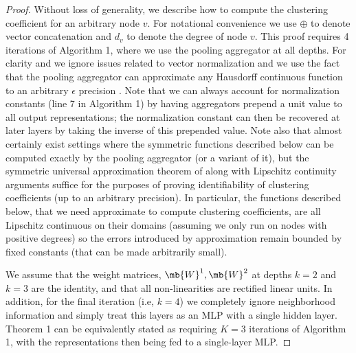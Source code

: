 \begin{proof}
Without loss of generality, we describe how to compute the clustering coefficient for an arbitrary node $v$.
For notational convenience we use $\oplus$ to denote vector concatenation and $d_v$ to denote the degree of node $v$.
This proof requires 4 iterations of Algorithm 1, where we use the pooling aggregator at all depths. 
For clarity and we ignore issues related to vector normalization and we use the fact that the pooling aggregator can approximate any Hausdorff continuous function to an arbitrary $\epsilon$ precision \cite{qi2016pointnet}.
Note that we can always account for normalization constants (line 7 in Algorithm 1) by having aggregators prepend a unit value to all output representations; the normalization constant can then be recovered at later layers by taking the inverse of this prepended value. 
Note also that almost certainly exist settings where the symmetric functions described below can be computed exactly by the pooling aggregator (or a variant of it), but the symmetric universal approximation theorem of \cite{qi2016pointnet} along with Lipschitz continuity arguments suffice for the purposes of proving identifiability of clustering coefficients (up to an arbitrary precision).
In particular, the functions described below, that we need approximate to compute clustering coefficients, are all Lipschitz continuous on their domains (assuming we only run on nodes with positive degrees) so the errors introduced by approximation remain bounded by fixed constants (that can be made arbitrarily small). 

We assume that the weight matrices, $\mb{W}^1, \mb{W}^2$ at depths $k=2$ and $k=3$ are the identity, and that all non-linearities are rectified linear units. 
In addition, for the final iteration (i.e, $k=4$) we completely ignore neighborhood information and simply treat this layers as an MLP with a single hidden layer.
Theorem 1 can be equivalently stated as requiring $K=3$ iterations of Algorithm 1, with the representations then being fed to a single-layer MLP. 


\end{proof}
